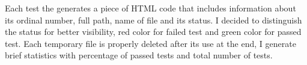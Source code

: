 \documentclass[10pt, a4paper]{article}
\begin{document}
Each test the generates a piece of HTML code that includes information about its ordinal number, full path, name of file and its status. I decided to distinguish the status for better visibility, red color for failed test and green color for passed test. Each temporary file is properly deleted after its use at the end, I generate brief statistics with percentage of passed tests and total number of tests.
\end{document}
